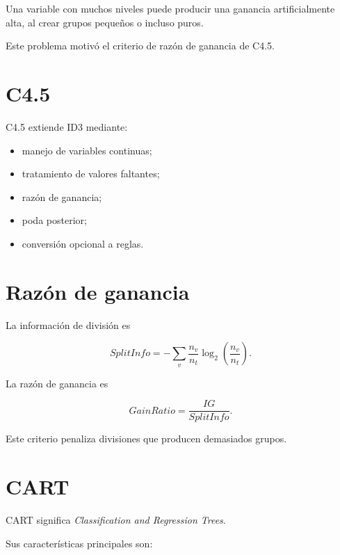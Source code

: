 \documentclass[
  spanish,
  10.5pt,
  letterpaper,
  DIV=11,
  numbers=noendperiod,
  oneside,
  open=any]{scrreprt}
\providecommand{\tightlist}{%
  \setlength{\itemsep}{0pt}\setlength{\parskip}{0pt}}
\theoremstyle{definition}
\theoremstyle{definition}
\theoremstyle{plain}
\theoremstyle{remark}
\begin{document}

Una variable con muchos niveles puede producir una ganancia
artificialmente alta, al crear grupos pequeños o incluso puros.

Este problema motivó el criterio de razón de ganancia de C4.5.

\section*{C4.5}\label{c4.5}


C4.5 extiende ID3 mediante:

\begin{itemize}
\tightlist
\item
  manejo de variables continuas;
\item
  tratamiento de valores faltantes;
\item
  razón de ganancia;
\item
  poda posterior;
\item
  conversión opcional a reglas.
\end{itemize}

\section*{Razón de ganancia}\label{razuxf3n-de-ganancia}


La información de división es

\[
SplitInfo
=
-
\sum_v
\frac{n_v}{n_t}
\log_2
\left(
\frac{n_v}{n_t}
\right).
\]

La razón de ganancia es

\[
GainRatio
=
\frac{IG}{SplitInfo}.
\]

Este criterio penaliza divisiones que producen demasiados grupos.

\section*{CART}\label{cart}


CART significa \emph{Classification and Regression Trees}.

Sus características principales son:
\end{document}
